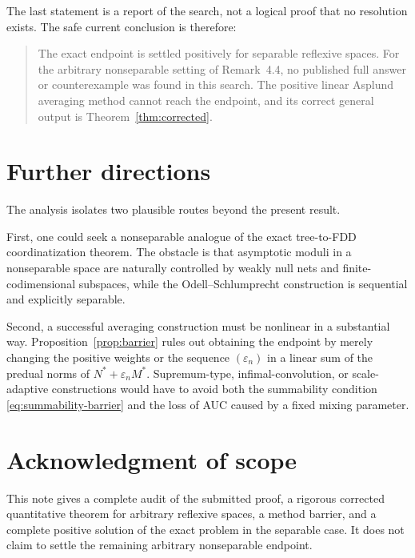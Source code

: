 \documentclass[11pt]{article}
\theoremstyle{definition}
\theoremstyle{remark}
\newcommand{\eps}{\varepsilon}
\begin{document}
The last statement is a report of the search, not a logical proof that no
resolution exists.  The safe current conclusion is therefore:

\begin{quote}
The exact endpoint is settled positively for separable reflexive spaces.  For
the arbitrary nonseparable setting of Remark~4.4, no published full answer or
counterexample was found in this search.  The positive linear Asplund
averaging method cannot reach the endpoint, and its correct general output is
Theorem~\ref{thm:corrected}.
\end{quote}

\section{Further directions}

The analysis isolates two plausible routes beyond the present result.

First, one could seek a nonseparable analogue of the exact tree-to-FDD
coordinatization theorem.  The obstacle is that asymptotic moduli in a
nonseparable space are naturally controlled by weakly null nets and
finite-codimensional subspaces, while the Odell--Schlumprecht construction is
sequential and explicitly separable.

Second, a successful averaging construction must be nonlinear in a substantial
way.  Proposition~\ref{prop:barrier} rules out obtaining the endpoint by merely
changing the positive weights or the sequence \((\eps_n)\) in a linear sum of
the predual norms of \(N^*+\eps_nM^*\).  Supremum-type, infimal-convolution,
or scale-adaptive constructions would have to avoid both the summability
condition \eqref{eq:summability-barrier} and the loss of AUC caused by a fixed
mixing parameter.

\section*{Acknowledgment of scope}

This note gives a complete audit of the submitted proof, a rigorous corrected
quantitative theorem for arbitrary reflexive spaces, a method barrier, and a
complete positive solution of the exact problem in the separable case.  It does
not claim to settle the remaining arbitrary nonseparable endpoint.
\end{document}

